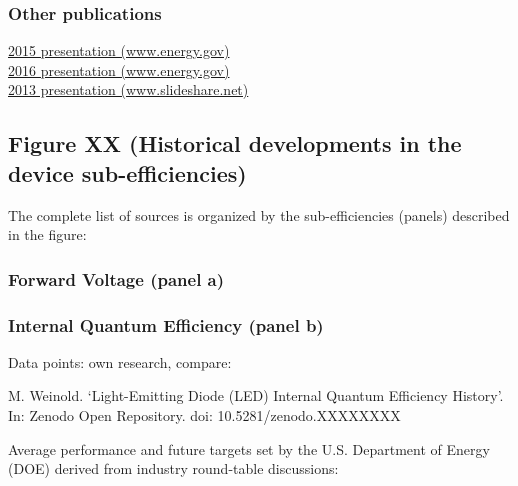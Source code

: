 \documentclass{article}
\begin{document}
\subsubsection{Other publications}

\href{https://web.archive.org/web/20170801160530/https://www.energy.gov/sites/prod/files/2015/02/f19/craford_innovation_sanfrancisco2015.pdf}{2015 presentation (www.energy.gov)} \\
\href{https://web.archive.org/web/20170715230721/https://www.energy.gov/sites/prod/files/2016/02/f29/sun_china_raleigh2016.pdf}{2016 presentation (www.energy.gov)} \\
\href{http://web.archive.org/web/20160425025936/https://www.slideshare.net/Yole_Developpement/yole-led-packagingjanuary2013reportsample}{2013 presentation (www.slideshare.net)}

\subsection{Figure XX (Historical developments in the device sub-efficiencies)}

The complete list of sources is organized by the sub-efficiencies (panels) described in the figure:

\subsubsection{Forward Voltage (panel a)}

\cite{nichia2001data}\cite{lumi2002data}\cite{gen2005data}\cite{candlepwr2005data}\cite{lumi2006data}\cite{lumi2007data}\cite{nichia2008data}\cite{lumi2008data}\cite{osram2008data}\cite{jeong2011high}\cite{osram2012data}\cite{osram2013data}\cite{osram2014data}\cite{lumi2016data_1}\cite{lumi2016data_2}\cite{epistar2017data}\cite{osram2017data_1}\cite{osram2017data_2}\cite{samsung2017data}\cite{samsung2018data}\cite{osram2018data}\cite{epistar2018data}\cite{lumi2019data}

\subsubsection{Internal Quantum Efficiency (panel b)}

Data points: own research, compare:

M. Weinold. ‘Light-Emitting Diode (LED) Internal Quantum Efficiency History’.
In: Zenodo Open Repository. doi: 10.5281/zenodo.XXXXXXXX

Average performance and future targets set by the U.S. Department of Energy (DOE) derived from industry round-table discussions:
\end{document}
